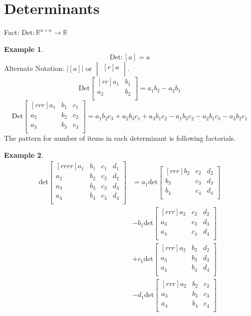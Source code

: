 \documentclass{report}
\theoremstyle{plain}
\theoremstyle{definition}
\newtheorem*{ex}{Example}
\theoremstyle{plain}
\begin{document}
\section{Determinants}
Fact: $\mathrm{Det:}\mathbb{R}^{n \times n} \rightarrow \mathbb{R}$
\begin{ex}
\[ \mathrm{Det:}[a] = a \]
Alternate Notation: $|[a]|$ or $\begin{vmatrix}[r]a\\\end{vmatrix}$.
\[ \mathrm{Det}\begin{bmatrix}[rr]a_1&b_1\\a_2&b_2\\\end{bmatrix}=a_1b_2-a_2b_1 \]
\[ \mathrm{Det}\begin{bmatrix}[rrr]a_1&b_1&c_1\\a_2&b_2&c_2\\a_3&b_3&c_3\\\end{bmatrix}=a_1b_2c_3+a_2b_3c_1+a_3b_1c_2-a_1b_3c_2-a_2b_1c_3-a_3b_2c_1 \]
The pattern for number of items in each determinant is following factorials.
\end{ex}
\begin{ex}
\begin{align*}
\mathrm{det}\begin{bmatrix}[rrrr]a_1&b_1&c_1&d_1\\a_2&b_2&c_2&d_2\\a_3&b_3&c_3&d_3\\a_4&b_4&c_4&d_4\\\end{bmatrix}&=a_1\mathrm{det}\begin{bmatrix}[rrr]b_2&c_2&d_2\\b_3&c_3&d_3\\b_4&c_4&d_4\\\end{bmatrix}\\
&-b_1\mathrm{det}\begin{bmatrix}[rrr]a_2&c_2&d_2\\a_3&c_3&d_3\\a_4&c_4&d_4\\\end{bmatrix}\\
&+c_1\mathrm{det}\begin{bmatrix}[rrr]a_2&b_2&d_2\\a_3&b_3&d_3\\a_4&b_4&d_4\\\end{bmatrix}\\
&-d_1\mathrm{det}\begin{bmatrix}[rrr]a_2&b_2&c_2\\a_3&b_3&c_3\\a_4&b_4&c_4\\\end{bmatrix}
\end{align*}
\end{ex}
\end{document}
